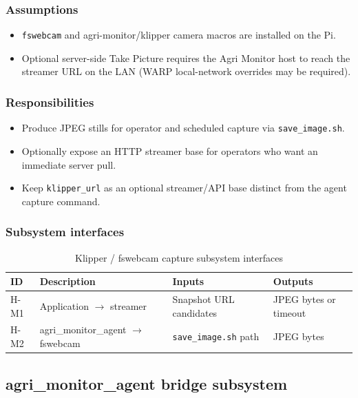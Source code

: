\subsubsection{Assumptions}
\begin{itemize}
  \item \texttt{fswebcam} and agri-monitor/klipper camera macros are installed on the Pi.
  \item Optional server-side Take Picture requires the Agri Monitor host to reach the streamer URL on the LAN (WARP local-network overrides may be required).
\end{itemize}

\subsubsection{Responsibilities}
\begin{itemize}
  \item Produce JPEG stills for operator and scheduled capture via \texttt{save\_image.sh}.
  \item Optionally expose an HTTP streamer base for operators who want an immediate server pull.
  \item Keep \texttt{klipper\_url} as an optional streamer/API base distinct from the agent capture command.
\end{itemize}

\subsubsection{Subsystem interfaces}
\begin{table}[H]
\centering
\small
\begin{tabular}{|p{0.9cm}|p{3.4cm}|p{3.0cm}|p{3.5cm}|}
\hline
\textbf{ID} & \textbf{Description} & \textbf{Inputs} & \textbf{Outputs} \\
\hline
H-M1 & Application $\rightarrow$ streamer & Snapshot URL candidates & JPEG bytes or timeout \\
\hline
H-M2 & agri\_monitor\_agent $\rightarrow$ fswebcam & \texttt{save\_image.sh} path & JPEG bytes \\
\hline
\end{tabular}
\caption{Klipper / fswebcam capture subsystem interfaces}
\end{table}

\subsection{agri\_monitor\_agent bridge subsystem}

